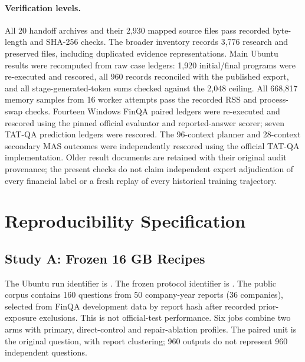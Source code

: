 \documentclass[10pt]{article}
\begin{document}
\paragraph{Verification levels.}
All 20 handoff archives and their 2,930 mapped source files pass recorded byte-length and SHA-256 checks. The broader inventory records 3,776 research and preserved files, including duplicated evidence representations. Main Ubuntu results were recomputed from raw case ledgers: 1,920 initial/final programs were re-executed and rescored, all 960 records reconciled with the published export, and all stage-generated-token sums checked against the 2,048 ceiling. All 668,817 memory samples from 16 worker attempts pass the recorded RSS and process-swap checks. Fourteen Windows FinQA paired ledgers were re-executed and rescored using the pinned official evaluator and reported-answer scorer; seven TAT-QA prediction ledgers were rescored. The 96-context planner and 28-context secondary MAS outcomes were independently rescored using the official TAT-QA implementation. Older result documents are retained with their original audit provenance; the present checks do not claim independent expert adjudication of every financial label or a fresh replay of every historical training trajectory.

\section{Reproducibility Specification}
\subsection{Study A: Frozen 16 GB Recipes}
The Ubuntu run identifier is . The frozen protocol identifier is . The public corpus contains 160 questions from 50 company-year reports (36 companies), selected from FinQA development data by report hash after recorded prior-exposure exclusions. This is not official-test performance. Six jobs combine two arms with primary, direct-control and repair-ablation profiles. The paired unit is the original question, with report clustering; 960 outputs do not represent 960 independent questions.
\end{document}
